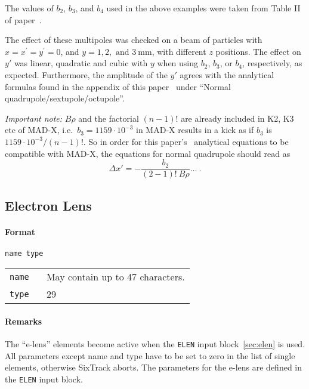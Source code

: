 \bigskip
\noindent The values of $b_2$, $b_3$, and $b_4$ used in the above examples were taken from Table II of paper~\cite{RFmultsPaper}.

The effect of these multipoles was checked on a beam of particles with $x=x^{\prime}=y^{\prime}=0$, and $y= 1, 2, \text{ and } 3~\mathrm{mm}$, with different $z$ positions.
The effect on $y'$ was linear, quadratic and cubic with $y$ when using $b_2$, $b_3$, or $b_4$, respectively, as expected.
Furthermore, the amplitude of the $y'$ agrees with the analytical formulas found in the appendix of this paper~\cite{RFmultsPaper} under ``Normal quadrupole/sextupole/octupole''.

\textit{Important note:} $B\rho$ and the factorial $(n-1)!$ are already included in K2, K3 etc of MAD-X, i.e.\ $b_3=1159\cdot10^{-3}$ in MAD-X results in a kick as if $b_3$ is $1159\cdot10^{-3}/(n-1)!$.
So in order for this paper's~\cite{RFmultsPaper} analytical equations to be compatible with MAD-X, the equations for normal quadrupole should read as
\begin{equation*}
    \Delta x'=-\frac{b_2}{(2-1)! ~ B\rho} \ldots~.
\end{equation*}

\subsection{Electron Lens} \label{ELEN}

\paragraph{Format} \texttt{name type}

\bigskip
\begin{tabular}{@{}lp{0.8\linewidth}}
    \texttt{name} & May contain up to 47 characters. \\
    \texttt{type} & 29
\end{tabular}

\paragraph{Remarks}
The ``e-lens'' elements become active when the \texttt{ELEN} input block~\ref{sec:elen} is used.
All parameters except name and type have to be set to zero in the list of single elements, otherwise SixTrack aborts.
The parameters for the e-lens are defined in the \texttt{ELEN} input block.

